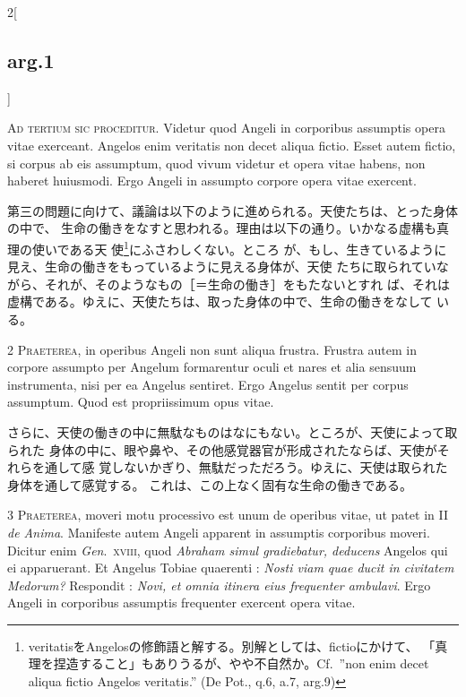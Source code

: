 \documentclass[paper=a4paper,fontsize=10pt,jafontsize=9pt,titlepage]{jlreq}
\begin{document}
\begin{paracol}{2}[\subsection{arg.1}]

{\huge A}{\scshape d tertium sic proceditur}. Videtur quod
Angeli in corporibus assumptis opera vitae exerceant. Angelos enim
veritatis non decet aliqua fictio. Esset autem fictio, si corpus ab eis
assumptum, quod vivum videtur et opera vitae habens, non haberet
huiusmodi. Ergo Angeli in assumpto corpore opera vitae exercent.

\switchcolumn

第三の問題に向けて、議論は以下のように進められる。天使たちは、とった身体の中で、
 生命の働きをなすと思われる。理由は以下の通り。いかなる虚構も真理の使いである天
 使\footnote{veritatisをAngelosの修飾語と解する。別解としては、fictioにかけて、
 「真理を捏造すること」もありうるが、やや不自然か。Cf.~''non enim decet aliqua
 fictio Angelos veritatis.'' (De Pot., q.6, a.7, arg.9)}にふさわしくない。ところ
 が、もし、生きているように見え、生命の働きをもっているように見える身体が、天使
 たちに取られていながら、それが、そのようなもの［＝生命の働き］をもたないとすれ
 ば、それは虚構である。ゆえに、天使たちは、取った身体の中で、生命の働きをなして
 いる。


{\scshape 2 Praeterea}, in operibus Angeli non sunt
aliqua frustra. Frustra autem in corpore assumpto per Angelum
formarentur oculi et nares et alia sensuum instrumenta, nisi per ea
Angelus sentiret. Ergo Angelus sentit per corpus assumptum. Quod est
propriissimum opus vitae.

\switchcolumn

さらに、天使の働きの中に無駄なものはなにもない。ところが、天使によって取られた
 身体の中に、眼や鼻や、その他感覚器官が形成されたならば、天使がそれらを通して感
 覚しないかぎり、無駄だっただろう。ゆえに、天使は取られた身体を通して感覚する。
 これは、この上なく固有な生命の働きである。


{\scshape 3 Praeterea}, moveri motu processivo est unum de operibus vitae, ut
patet in II {\itshape de Anima}. Manifeste autem Angeli apparent in assumptis
corporibus moveri. Dicitur enim {\itshape Gen}.~{\scshape xviii}, quod {\itshape
Abraham simul gradiebatur, deducens} Angelos qui ei apparuerant. Et Angelus
Tobiae quaerenti : {\itshape Nosti viam quae ducit in civitatem Medorum?}
Respondit : {\itshape Novi, et omnia itinera eius frequenter ambulavi}. Ergo
Angeli in corporibus assumptis frequenter exercent opera vitae.


\end{paracol}
\end{document}
